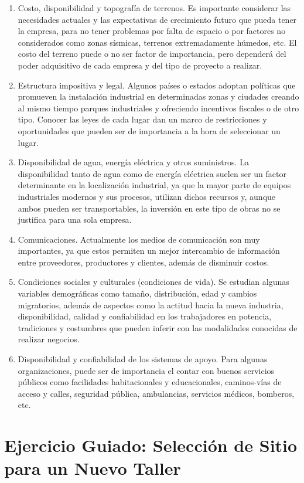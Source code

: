 \documentclass[../main]{subfiles}
\begin{document}
\begin{enumerate}
  \item Costo, disponibilidad y topografía de terrenos. Es importante
    considerar las necesidades actuales y las expectativas de crecimiento
    futuro que pueda tener la empresa, para no tener problemas por falta de
    espacio o por factores no considerados como zonas sísmicas, terrenos
    extremadamente húmedos, etc. El costo del terreno puede o no ser factor
    de importancia, pero dependerá del poder adquisitivo de cada empresa y
    del tipo de proyecto a realizar.
  \item  Estructura impositiva y legal. Algunos países o estados adoptan
    políticas que promueven la instalación industrial en determinadas zonas y
    ciudades creando al mismo tiempo parques industriales y ofreciendo
    incentivos fiscales o de otro tipo. Conocer las leyes de cada lugar dan
    un marco de restricciones y oportunidades que pueden ser de
    importancia a la hora de seleccionar un lugar.
  \item Disponibilidad de agua, energía eléctrica y otros suministros. La
    disponibilidad tanto de agua como de energía eléctrica suelen ser un
    factor determinante en la localización industrial, ya que la mayor parte de
    equipos industriales modernos y sus procesos, utilizan dichos recursos y,
    aunque ambos pueden ser transportables, la inversión en este tipo de
    obras no se justifica para una sola empresa.
  \item  Comunicaciones. Actualmente los medios de comunicación son muy
    importantes, ya que estos permiten un mejor intercambio de información
    entre proveedores, productores y clientes, además de disminuir costos.
  \item Condiciones sociales y culturales (condiciones de vida). Se estudian
    algunas variables demográficas como tamaño, distribución, edad y
    cambios migratorios, además de aspectos como la actitud hacia la nueva
    industria, disponibilidad, calidad y confiabilidad en los trabajadores en
    potencia, tradiciones y costumbres que pueden inferir con las
    modalidades conocidas de realizar negocios.
  \item Disponibilidad y confiabilidad de los sistemas de apoyo. Para
    algunas organizaciones, puede ser de importancia el contar con buenos
    servicios públicos como facilidades habitacionales y educacionales,
    caminos-vías de acceso y calles, seguridad pública, ambulancias,
    servicios médicos, bomberos, etc.
\end{enumerate}
\section{Ejercicio Guiado: Selección de Sitio para un Nuevo Taller}
\end{document}
